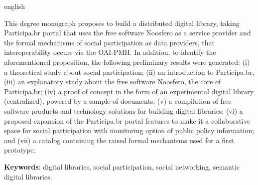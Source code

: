 \begin{resumo}[Abstract]
  \begin{otherlanguage*}{english} 
  
  
This degree monograph proposes to build a distributed digital library, taking Participa.br portal that uses the free software Noosfero as a service provider and the formal mechanisms of social participation as data providers, that interoperability occurs via the OAI-PMH. In addition, to identify the aforementioned proposition, the following preliminary results were generated: (i) a theoretical study about social participation; (ii) an introduction to Participa.br, (iii) an explanatory study about the free software Noosfero, the core of Participa.br; (iv) a proof of concept in the form of an experimental digital library (centralized), powered by a sample of documents; (v) a compilation of free software products and technology solutions for building digital libraries; (vi) a proposed expansion of the Participa.br portal features to make it a collaborative space for social participation with monitoring option of public policy information; and (vii) a catalog containing the raised formal mechanisms used for a first prototype.

  
  \vspace{\onelineskip}
 
  \noindent 
  \textbf{Keywords}: digital libraries, social participation, social networking, semantic digital libraries.
  \end{otherlanguage*}
\end{resumo}


